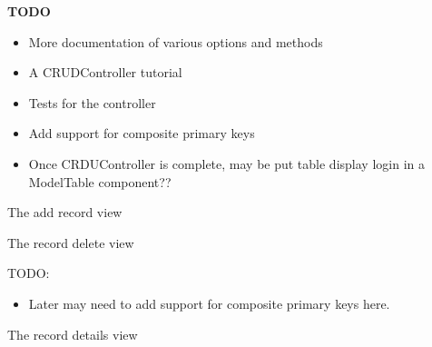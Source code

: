 \documentclass[letterpaper,10pt,english]{sphinxmanual}
\begin{document}
\begin{fulllineitems}
\begin{quote}
\begin{description}
\end{description}\end{quote}

\textbf{TODO}
\begin{itemize}
\item {} 
More documentation of various options and methods

\item {} 
A CRUDController tutorial

\item {} 
Tests for the controller

\item {} 
Add support for composite primary keys

\item {} 
Once CRDUController is complete, may be put table display login in a ModelTable component??

\end{itemize}

\begin{fulllineitems}
\label{pyck-controllers:pyck.controllers.CRUDController.add}
The add record view

\end{fulllineitems}


\begin{fulllineitems}
\label{pyck-controllers:pyck.controllers.CRUDController.delete}
The record delete view

TODO:
\begin{itemize}
\item {} 
Later may need to add support for composite primary keys here.

\end{itemize}

\end{fulllineitems}


\begin{fulllineitems}
\label{pyck-controllers:pyck.controllers.CRUDController.details}
The record details view

\end{fulllineitems}


\end{fulllineitems}
\end{document}
